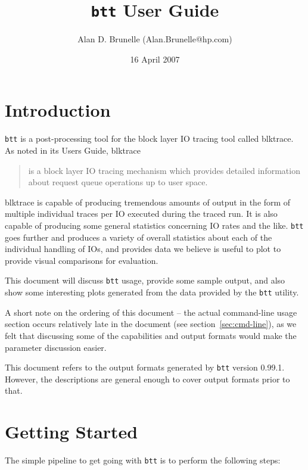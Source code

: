 \documentclass{article}
\title{\texttt{btt} User Guide}
\author{Alan D. Brunelle (Alan.Brunelle@hp.com)}
\date{16 April 2007}
\begin{document}
\maketitle
\section{\label{sec:intro}Introduction}

\texttt{btt} is a post-processing tool for the block layer IO tracing tool called blktrace. As noted in its Users Guide, blktrace 
  \begin{quotation}
    is a block layer IO tracing mechanism which provides detailed
    information about request queue operations up to user space.
  \end{quotation}

blktrace is capable of producing tremendous amounts of output in the
form of multiple individual traces per IO executed during the traced
run. It is also capable of producing some general statistics concerning
IO rates and the like. \texttt{btt} goes further and produces a variety
of overall statistics about each of the individual handling of IOs, and
provides data we believe is useful to plot to provide visual comparisons
for evaluation.

This document will discuss \texttt{btt} usage, provide some sample output,
and also show some interesting plots generated from the data provided
by the \texttt{btt} utility.

\bigskip
A short note on the ordering of this document -- the actual
command-line usage section occurs relatively late in the document (see
section~\ref{sec:cmd-line}), as we felt that discussing some of the
capabilities and output formats would make the parameter discussion
easier.

\bigskip
  This document refers to the output formats generated by \texttt{btt}
  version 0.99.1.  However, the descriptions are general enough to cover
  output formats prior to that.

\newpage\tableofcontents

\newpage\section{\label{sec:getting-started}Getting Started}

  The simple pipeline to get going with \texttt{btt} is to perform the
  following steps:
\end{document}
